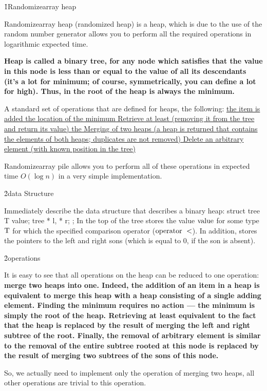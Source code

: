 \h1{Randomizearray heap}

Randomizearray heap (randomized heap) is a heap, which is due to the use of the random number generator allows you to perform all the required operations in logarithmic expected time.

\bf{Heap} is called a binary tree, for any node which satisfies that the value in this node is less than or equal to the value of all its descendants (it's a lot for minimum; of course, symmetrically, you can define a lot for high). Thus, in the root of the heap is always the minimum.

A standard set of operations that are defined for heaps, the following:
\ul{
\li the item is added
\li the location of the minimum
\li Retrieve at least (removing it from the tree and return its value)
\li the Merging of two heaps (a heap is returned that contains the elements of both heaps; duplicates are not removed)
\li Delete an arbitrary element (with known position in the tree)
}

Randomizearray pile allows you to perform all of these operations in expected time $O(\log n)$ in a very simple implementation.

\h2{data Structure}

Immediately describe the data structure that describes a binary heap:
\code
struct tree {
T value;
tree * l, * r;
};
\endcode
In the top of the tree stores the value $\rm value$ for some type $\rm T$ for which the specified comparison operator ($\rm operator\ <$). In addition, stores the pointers to the left and right sons (which is equal to 0, if the son is absent).

\h2{operations}

It is easy to see that all operations on the heap can be reduced to one operation: \bf{merge} two heaps into one. Indeed, the addition of an item in a heap is equivalent to merge this heap with a heap consisting of a single adding element. Finding the minimum requires no action --- the minimum is simply the root of the heap. Retrieving at least equivalent to the fact that the heap is replaced by the result of merging the left and right subtree of the root. Finally, the removal of arbitrary element is similar to the removal of the entire subtree rooted at this node is replaced by the result of merging two subtrees of the sons of this node.

So, we actually need to implement only the operation of merging two heaps, all other operations are trivial to this operation.

